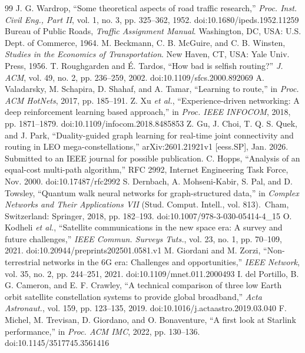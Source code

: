 \documentclass[journal]{IEEEtran}
\begin{document}
\begin{thebibliography}{99}
 J. G. Wardrop, ``Some theoretical aspects of road traffic research,''
\emph{Proc. Inst. Civil Eng., Part II}, vol. 1, no. 3, pp. 325--362, 1952. doi:10.1680/ipeds.1952.11259
 Bureau of Public Roads, \emph{Traffic Assignment Manual}. Washington, DC,
USA: U.S. Dept. of Commerce, 1964.
 M. Beckmann, C. B. McGuire, and C. B. Winsten, \emph{Studies in the
Economics of Transportation}. New Haven, CT, USA: Yale Univ. Press, 1956.
 T. Roughgarden and \'E. Tardos, ``How bad is selfish routing?''
\emph{J. ACM}, vol. 49, no. 2, pp. 236--259, 2002. doi:10.1109/sfcs.2000.892069
 A. Valadarsky, M. Schapira, D. Shahaf, and A. Tamar, ``Learning to
route,'' in \emph{Proc. ACM HotNets}, 2017, pp. 185--191.
 Z. Xu \emph{et al.}, ``Experience-driven networking: A deep reinforcement
learning based approach,'' in \emph{Proc. IEEE INFOCOM}, 2018, pp. 1871--1879. doi:10.1109/infocom.2018.8485853
 Z. Gu, J. Choi, T. Q. S. Quek, and J. Park, ``Duality-guided graph
learning for real-time joint connectivity and routing in LEO mega-constellations,''
arXiv:2601.21921v1 [eess.SP], Jan. 2026. Submitted to an IEEE journal for possible publication.
 C. Hopps, ``Analysis of an equal-cost multi-path algorithm,'' RFC 2992,
Internet Engineering Task Force, Nov. 2000. doi:10.17487/rfc2992
 S. Dernbach, A. Mohseni-Kabir, S. Pal, and D. Towsley, ``Quantum walk
neural networks for graph-structured data,'' in \emph{Complex Networks and Their
Applications VII} (Stud. Comput. Intell., vol. 813).\ Cham, Switzerland: Springer, 2018,
pp. 182--193. doi:10.1007/978-3-030-05414-4\_15
 O. Kodheli \emph{et al.}, ``Satellite communications in the new space
era: A survey and future challenges,'' \emph{IEEE Commun. Surveys Tuts.}, vol. 23, no. 1,
pp. 70--109, 2021. doi:10.20944/preprints202501.0581.v1
 M. Giordani and M. Zorzi, ``Non-terrestrial networks in the 6G era:
Challenges and opportunities,'' \emph{IEEE Network}, vol. 35, no. 2, pp. 244--251, 2021. doi:10.1109/mnet.011.2000493
 I. del Portillo, B. G. Cameron, and E. F. Crawley, ``A technical
comparison of three low Earth orbit satellite constellation systems to provide global
broadband,'' \emph{Acta Astronaut.}, vol. 159, pp. 123--135, 2019. doi:10.1016/j.actaastro.2019.03.040
 F. Michel, M. Trevisan, D. Giordano, and O. Bonaventure, ``A first look
at Starlink performance,'' in \emph{Proc. ACM IMC}, 2022, pp. 130--136. doi:10.1145/3517745.3561416

\end{thebibliography}
\end{document}
